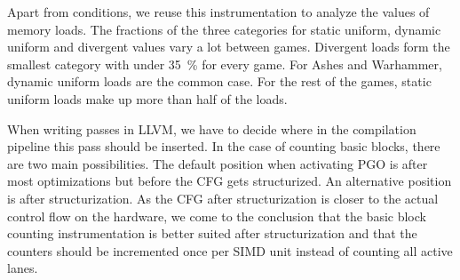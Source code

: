 Apart from conditions, we reuse this instrumentation to analyze the values of memory loads.
The fractions of the three categories for static uniform, dynamic uniform and divergent values vary a lot between games.
Divergent loads form the smallest category with under \SI{35}{\percent} for every game.
For Ashes and Warhammer, dynamic uniform loads are the common case.
For the rest of the games, static uniform loads make up more than half of the loads.

When writing passes in LLVM, we have to decide where in the compilation pipeline this pass should be inserted.
In the case of counting basic blocks, there are two main possibilities.
The default position when activating PGO is after most optimizations but before the CFG gets structurized.
An alternative position is after structurization.
As the CFG after structurization is closer to the actual control flow on the hardware, we come to the conclusion that the basic block counting instrumentation is better suited after structurization and that the counters should be incremented once per SIMD unit instead of counting all active lanes.
